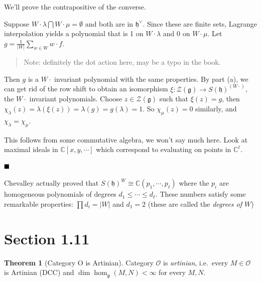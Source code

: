 \documentclass[11pt]{scrartcl}
\theoremstyle{definition}
\theoremstyle{theorem}
\newtheorem{theorem}{Theorem}[section]
\theoremstyle{proof}
\newenvironment{proof}
{\pushQED{$\qed$}\pf}
{\par\popQED\endpf}
\theoremstyle{definition}
\theoremstyle{break}
\theoremstyle{problem}
\providecommand{\tightlist}{%
  \setlength{\itemsep}{0pt}\setlength{\parskip}{0pt}}
\newcommand{\CC}[0]{{\mathbb{C}}}
\newcommand{\abs}[1]{{\left\lvert {#1} \right\rvert}}
\newcommand{\dual}[0]{^\vee}
\newcommand{\intersect}[0]{\bigcap}
\newcommand{\lieg}[0]{{\mathfrak{g}}}
\newcommand{\lieh}[0]{{\mathfrak{h}}}
\newcommand{\OO}[0]{{\mathcal{O}}}
\newcommand{\mcz}[0]{{\mathcal{Z}}}
\renewcommand{\qed}[0]{\hfill\blacksquare}
\renewcommand{\to}[0]{\longrightarrow}
\begin{document}
\begin{proof}[of (b)]

We'll prove the contrapositive of the converse.

Suppose \(W\cdot \lambda \intersect W\cdot \mu = \emptyset\) and both
are in \(\lieh\dual\). Since these are finite sets, Lagrange
interpolation yields a polynomial that is 1 on \(W\cdot \lambda\) and 0
on \(W\cdot \mu\). Let \(g = \frac{1}{\abs W} \sum_{w\in W} w\cdot f\).

\begin{quote}
Note: definitely the dot action here, may be a typo in the book.
\end{quote}

Then \(g\) is a \(W\cdot\) invariant polynomial with the same
properties. By part (a), we can get rid of the row shift to obtain an
isomorphism \(\xi: \mcz(\lieg) \to S(\lieh)^(W\cdot)\), the \(W\cdot\)
invariant polynomials. Choose \(z\in \mcz(\lieg)\) such that
\(\xi(z) = g\), then
\(\chi_\lambda(z) = \lambda(\xi(z)) = \lambda(g) = g(\lambda) = 1\). So
\(\chi_\mu(z) = 0\) similarly, and
\(\chi_\lambda = \chi_\mu\).\end{proof}

\begin{proof}[of (c)]

This follows from some commutative algebra, we won't say much here. Look
at maximal ideals in \(\CC[x, y,\cdots]\) which correspond to evaluating
on points in \(\CC^\ell\).\end{proof}

\(\qed\)

\begin{description}
\tightlist
\item[Remark]
Chevalley actually proved that
\(S(\lieh)^W \cong \CC(p_1, \cdots, p_\ell)\) where the \(p_i\) are
homogeneous polynomials of degrees \(d_1 \leq \cdots \leq d_\ell\).
These numbers satisfy some remarkable properties:
\(\prod d_i = \abs{W}\) and \(d_1 = 2\) (these are called the
\emph{degrees of \(W\)})
\end{description}

\hypertarget{section-1.11}{%
\section{Section 1.11}\label{section-1.11}}

\begin{theorem}[Category O is Artinian]

Category \(\OO\) is \emph{artinian}, i.e.~every \(M \in \OO\) is
Artinian (DCC) and \(\dim \hom_\lieg(M, N) < \infty\) for every
\(M, N\).\end{theorem}
\end{document}
